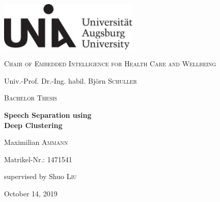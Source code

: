 \pagestyle{empty}

\begin{titlepage}
	\centering
	\includegraphics[width=0.5\textwidth]{figure/Uni_Aug_Logo_Basis_pos_B}\par
	\vspace{1cm}
	{\scshape\large Chair of Embedded Intelligence for Health Care and Wellbeing \par}
	{Univ.-Prof. Dr.-Ing. habil. Bj{\"o}rn \textsc{Schuller} \par}
	\vspace{2.5cm}
	{\scshape\LARGE Bachelor Thesis \par}
	\vspace{1.0cm}
	{\Huge\bfseries Speech Separation using\\Deep Clustering \par}
	\vspace{3.0cm}
	{\Large Maximilian \textsc{Ammann} \par}
	{Matrikel-Nr.: 1471541 \par}
	\vfill

	supervised by Shuo \textsc{Liu}

	\vspace{2cm}

	{\large October 14, 2019\par}
\end{titlepage}


\small

